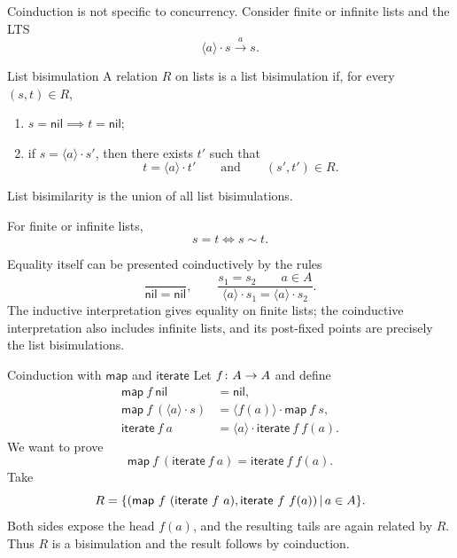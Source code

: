 \documentclass[a4paper]{article}
\newcommand{\nil}{\mathsf{nil}}
\newcommand{\trans}[1]{\xrightarrow{#1}}
\begin{document}
Coinduction is not specific to concurrency.
Consider finite or infinite lists and the LTS
\[
    \langle a\rangle\cdot s\trans{a}s.
\]

\begin{snippetdefinition}{List bisimulation}
    A relation \(R\) on lists is a list bisimulation if, for every \((s,t)\in R\),
    \begin{enumerate}
        \item \(s=\nil\implies t=\nil\);
        \item if \(s=\langle a\rangle\cdot s'\), then there exists \(t'\) such that
        \[
            t=\langle a\rangle\cdot t'
            \qquad\text{and}\qquad
            (s',t')\in R.
        \]
    \end{enumerate}
    List bisimilarity is the union of all list bisimulations.
\end{snippetdefinition}

\begin{snippetproposition}{}
    For finite or infinite lists,
    \[
        s=t
        \iff
        s\sim t.
    \]
\end{snippetproposition}

Equality itself can be presented coinductively by the rules
\[
    \frac{}{\nil=\nil},
    \qquad
    \frac{s_1=s_2\qquad a\in A}
    {\langle a\rangle\cdot s_1=\langle a\rangle\cdot s_2}.
\]
The inductive interpretation gives equality on finite lists; the coinductive interpretation also includes infinite lists, and its post-fixed points are precisely the list bisimulations.

\begin{snippetexample}{Coinduction with \(\mathsf{map}\) and \(\mathsf{iterate}\)}
    Let \(f\colon A\to A\) and define
    \begin{align*}
        \mathsf{map}\ f\ \nil &= \nil,\\
        \mathsf{map}\ f\ (\langle a\rangle\cdot s)
        &=\langle f(a)\rangle\cdot\mathsf{map}\ f\ s,\\
        \mathsf{iterate}\ f\ a
        &=\langle a\rangle\cdot\mathsf{iterate}\ f\ f(a).
    \end{align*}
    We want to prove
    \[
        \mathsf{map}\ f\ (\mathsf{iterate}\ f\ a)
        =
        \mathsf{iterate}\ f\ f(a).
    \]
    Take
    \[
        R
        =
        \{(
        \mathsf{map}\ f\ (\mathsf{iterate}\ f\ a),
        \mathsf{iterate}\ f\ f(a))
        \,|\, a\in A\}.
    \]
    Both sides expose the head \(f(a)\), and the resulting tails are again related by \(R\).
    Thus \(R\) is a bisimulation and the result follows by coinduction.
\end{snippetexample}
\end{document}
